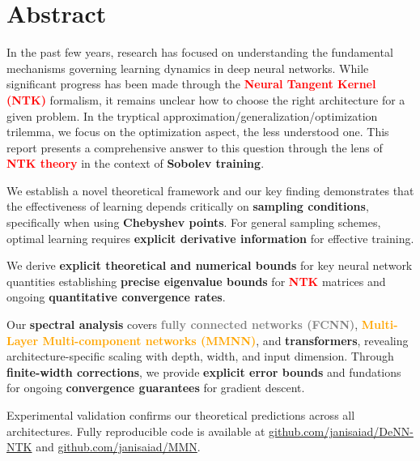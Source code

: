 \documentclass[a4paper]{article}
\theoremstyle{plain}
\theoremstyle{definition}
\theoremstyle{remark}
\begin{document}
\newpage
\tableofcontents
\newpage








\section*{Abstract}

In the past few years, research has focused on understanding the fundamental mechanisms governing learning dynamics in deep neural networks. While significant progress has been made through the \textcolor{red}{\textbf{Neural Tangent Kernel (NTK)}} formalism, it remains unclear how
to choose the right architecture for a given problem. In the tryptical approximation/generalization/optimization trilemma, we focus on the optimization aspect, the less understood one.
This report presents a comprehensive answer to this question through the lens of \textcolor{red}{\textbf{NTK theory}} in the context of
\textbf{Sobolev training}.

We establish a novel theoretical framework and our key finding demonstrates that the effectiveness of learning depends critically on \textbf{sampling conditions}, specifically when using \textbf{Chebyshev points}.
For general sampling schemes, optimal learning requires \textbf{explicit derivative information} for effective training.

We derive \textbf{explicit theoretical and numerical bounds} for key neural network quantities establishing \textbf{precise eigenvalue bounds} for \textcolor{red}{\textbf{NTK}} matrices and ongoing \textbf{quantitative convergence rates}.

Our \textbf{spectral analysis} covers \textcolor{gray}{\textbf{fully connected networks (FCNN)}}, \textcolor{orange}{\textbf{Multi-Layer Multi-component networks (MMNN)}}, and \textbf{transformers}, revealing architecture-specific scaling with depth, width, and input dimension. 
Through \textbf{finite-width corrections}, we provide \textbf{explicit error bounds} and fundations for ongoing \textbf{convergence guarantees} for gradient descent.

Experimental validation confirms our theoretical predictions across all architectures. Fully reproducible code is available at \href{https://github.com/janisaiad/DeNN-NTK}{github.com/janisaiad/DeNN-NTK} and \href{https://github.com/janisaiad/MMN}{github.com/janisaiad/MMN}.

\vspace{0.5cm}
\end{document}
